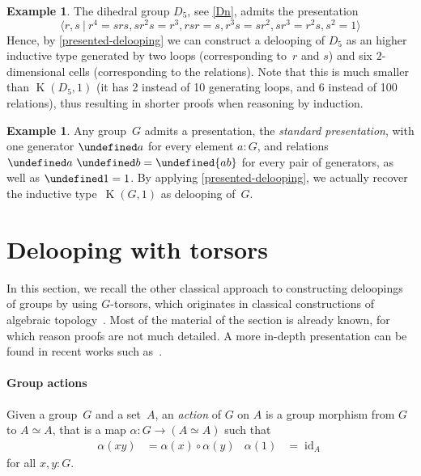 \documentclass[10pt,a4paper]{amsart}
\theoremstyle{definition}
\newtheorem{example}[theorem]{Example}
\newcommand{\id}{\operatorname{id}} %
\newcommand{\pres}[2]{\langle #1\ |\ #2\rangle} %
\newcommand{\K}{\operatorname{K}} %
\let\ul\undefined
\newcommand{\ul}{\underline}
\begin{document}
\begin{example}
  The dihedral group $D_5$, see \cref{Dn}, admits the presentation
  \[
    \pres{r,s}{r^4=srs,sr^2s=r^3,rsr=s,r^3s=sr^2,sr^3=r^2s,s^2=1}
  \]
  Hence, by \cref{presented-delooping} we can construct a delooping of $D_5$ as an
  higher inductive type generated by two loops (corresponding to~$r$ and $s$)
  and six $2$-dimensional cells (corresponding to the relations). Note that this
  is much smaller than $\K(D_5,1)$ (it has 2 instead of 10 generating loops, and
  6 instead of 100 relations), thus resulting in shorter proofs when reasoning
  by induction.
\end{example}

\begin{example}
  Any group~$G$ admits a presentation, the \emph{standard presentation}, with one generator $\ul a$ for every element $a:G$, and relations $\ul a\,\,\ul b=\ul{ab}$ for every pair of generators, as well as $\ul 1=1$. By applying \cref{presented-delooping}, we actually recover the inductive type~$\K(G,1)$ as delooping of~$G$.
\end{example}


\section{Delooping with torsors}
\label{torsor-delooping}
In this section, we recall the other classical approach to constructing
deloopings of groups by using $G$-torsors, which originates in classical
constructions of algebraic topology~\cite{demazure1970groupes}. Most of the
material of the section is already known, for which reason proofs are not much
detailed. A more in-depth presentation can be found in recent works such
as~\cite{symmetry,buchholtz2023central}.

\paragraph{Group actions}
Given a group~$G$ and a set~$A$, an \emph{action} of $G$ on $A$ is a group
morphism from $G$ to $A \simeq A$, that is a map $\alpha : G\to (A \simeq A)$
such that
\begin{align}
  \label{action-equations}
  \alpha(xy)&= \alpha(x) \circ \alpha(y)
  &
  \alpha(1) &= \id_A
\end{align}
for all $x,y:G$.
\end{document}
